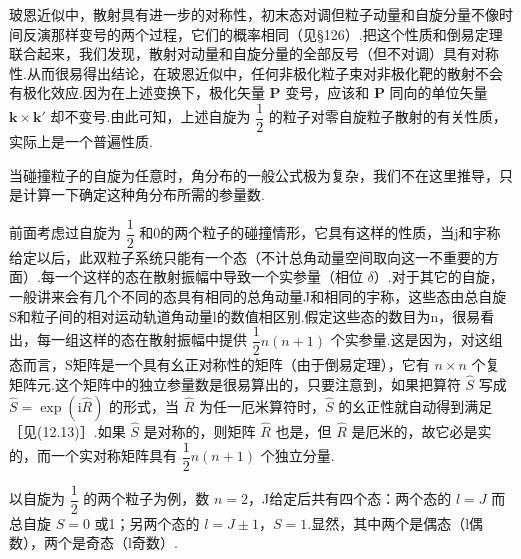 玻恩近似中，散射具有进一步的对称性，初末态对调但粒子动量和自旋分量不像时间反演那样变号的两个过程，它们的概率相同（见§126）.把这个性质和倒易定理联合起来，我们发现，散射对动量和自旋分量的全部反号（但不对调）具有对称性.从而很易得出结论，在玻恩近似中，任何非极化粒子束对非极化靶的散射不会有极化效应.因为在上述变换下，极化矢量 $\boldsymbol{P}$ 变号，应该和 $\boldsymbol{P}$ 同向的单位矢量
$\boldsymbol{k}\times\boldsymbol{k}'$ 却不变号.由此可知，上述自旋为 $\dfrac{1}{2}$ 的粒子对零自旋粒子散射的有关性质，实际上是一个普遍性质.

当碰撞粒子的自旋为任意时，角分布的一般公式极为复杂，我们不在这里推导，只是计算一下确定这种角分布所需的参量数.

前面考虑过自旋为 $\dfrac{1}{2}$ 和0的两个粒子的碰撞情形，它具有这样的性质，当j和宇称给定以后，此双粒子系统只能有一个态（不计总角动量空间取向这一不重要的方面）.每一个这样的态在散射振幅中导致一个实参量（相位 $\delta$）.对于其它的自旋，一般讲来会有几个不同的态具有相同的总角动量J和相同的宇称，这些态由总自旋S和粒子间的相对运动轨道角动量l的数值相区别.假定这些态的数目为n，很易看出，每一组这样的态在散射振幅中提供 $\dfrac{1}{2}n(n+1)$ 个实参量.这是因为，对这组态而言，S矩阵是一个具有幺正对称性的矩阵（由于倒易定理），它有 $n\times n$ 个复矩阵元.这个矩阵中的独立参量数是很易算出的，只要注意到，如果把算符 $\hat{S}$ 写成 $\hat{S}=\exp(\mathrm{i}\hat{R})$ 的形式，当 $\hat{R}$ 为任一厄米算符时，$\hat{S}$ 的幺正性就自动得到满足［见(12.13)］.如果 $\hat{S}$ 是对称的，则矩阵 $\hat{R}$ 也是，但 $\hat{R}$ 是厄米的，故它必是实的，而一个实对称矩阵具有 $\dfrac{1}{2}n(n+1)$ 个独立分量.

以自旋为 $\dfrac{1}{2}$ 的两个粒子为例，数 $n=2$，J给定后共有四个态：两个态的 $l=J$ 而总自旋 $S=0$ 或1；另两个态的 $l=J\pm1$，$S=1$.显然，其中两个是偶态（l偶数），两个是奇态（l奇数）.

